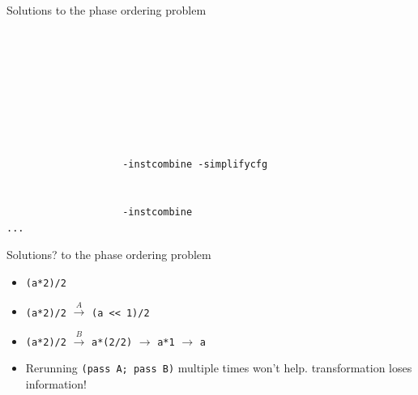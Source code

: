 \documentclass[8pt]{beamer}
\newcommand{\code}[1]{\texttt{#1}}
\begin{document}
\begin{frame}[fragile]{Solutions to the phase ordering problem}
\begin{verbatim}
                                                                    
                                                                       
                                                                     
                                                                        
                                                                              
                                                                       
                                                                       
                                                                
                    -instcombine -simplifycfg                                   
                                                               
                                                                        
                    -instcombine                                           
...
\end{verbatim}
\end{frame}

\begin{frame}[fragile]{Solutions? to the phase ordering problem}
\begin{itemize}
\item \code{(a*2)/2} \pause
\item \code{(a*2)/2} \pause $\xrightarrow{A}$ \code{(a << 1)/2 } \pause
\item \code{(a*2)/2} \pause $\xrightarrow{B}$ \code{a*(2/2)} \pause $\rightarrow$ \code{a*1} \pause $\rightarrow$ \code{a} \pause
\item Rerunning \texttt{(pass A; pass B)} multiple times won't help. transformation loses information!
\end{itemize}
\end{frame}
\end{document}

